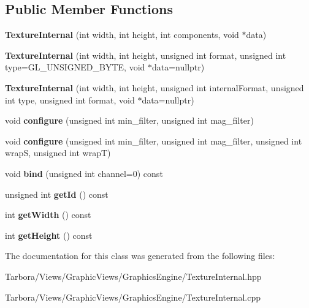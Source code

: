 \subsection*{Public Member Functions}
\begin{DoxyCompactItemize}
\item 
\mbox{\label{classTarbora_1_1TextureInternal_a9f31699905bd381a5e6191fb33c4f8d4}} 
{\bfseries Texture\+Internal} (int width, int height, int components, void $\ast$data)
\item 
\mbox{\label{classTarbora_1_1TextureInternal_a0b7549f45a39d4099998775c63ac0e26}} 
{\bfseries Texture\+Internal} (int width, int height, unsigned int format, unsigned int type=G\+L\+\_\+\+U\+N\+S\+I\+G\+N\+E\+D\+\_\+\+B\+Y\+TE, void $\ast$data=nullptr)
\item 
\mbox{\label{classTarbora_1_1TextureInternal_a2cdcaccd4bc462ad759b35fabaf0dcb5}} 
{\bfseries Texture\+Internal} (int width, int height, unsigned int internal\+Format, unsigned int type, unsigned int format, void $\ast$data=nullptr)
\item 
\mbox{\label{classTarbora_1_1TextureInternal_a72283dbdc4e657d35fac942819d2998d}} 
void {\bfseries configure} (unsigned int min\+\_\+filter, unsigned int mag\+\_\+filter)
\item 
\mbox{\label{classTarbora_1_1TextureInternal_a0dd33b54224ca6df624e612a60454d27}} 
void {\bfseries configure} (unsigned int min\+\_\+filter, unsigned int mag\+\_\+filter, unsigned int wrapS, unsigned int wrapT)
\item 
\mbox{\label{classTarbora_1_1TextureInternal_a6743d488849f3caf3e706a58b9c0f871}} 
void {\bfseries bind} (unsigned int channel=0) const
\item 
\mbox{\label{classTarbora_1_1TextureInternal_aed8a4573ee3ac8194fb0e4c4ea6b069a}} 
unsigned int {\bfseries get\+Id} () const
\item 
\mbox{\label{classTarbora_1_1TextureInternal_a495d050a9db1e3a9e271ac7f29320684}} 
int {\bfseries get\+Width} () const
\item 
\mbox{\label{classTarbora_1_1TextureInternal_a79c1e0e4834d16d2dfd609f7694cf9bb}} 
int {\bfseries get\+Height} () const
\end{DoxyCompactItemize}


The documentation for this class was generated from the following files\+:\begin{DoxyCompactItemize}
\item 
Tarbora/\+Views/\+Graphic\+Views/\+Graphics\+Engine/Texture\+Internal.\+hpp\item 
Tarbora/\+Views/\+Graphic\+Views/\+Graphics\+Engine/Texture\+Internal.\+cpp\end{DoxyCompactItemize}
